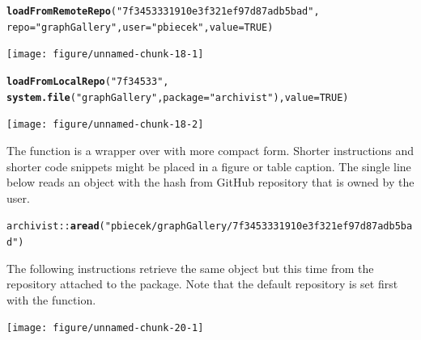 \documentclass[nojss]{jss}\usepackage[]{graphicx}\usepackage[]{color}
\makeatletter
\newcommand{\hlnum}[1]{\textcolor[rgb]{0.686,0.059,0.569}{#1}}%
\newcommand{\hlstr}[1]{\textcolor[rgb]{0.192,0.494,0.8}{#1}}%
\newcommand{\hlopt}[1]{\textcolor[rgb]{0,0,0}{#1}}%
\newcommand{\hlstd}[1]{\textcolor[rgb]{0.345,0.345,0.345}{#1}}%
\newcommand{\hlkwc}[1]{\textcolor[rgb]{0.333,0.667,0.333}{#1}}%
\newcommand{\hlkwd}[1]{\textcolor[rgb]{0.737,0.353,0.396}{\textbf{#1}}}%
\newenvironment{kframe}{%
 \def\at@end@of@kframe{}%
 \ifinner\ifhmode%
  \def\at@end@of@kframe{\end{minipage}}%
  \begin{minipage}{\columnwidth}%
 \fi\fi%
 \def\FrameCommand##1{\hskip\@totalleftmargin \hskip-\fboxsep
 \colorbox{shadecolor}{##1}\hskip-\fboxsep
     \hskip-\linewidth \hskip-\@totalleftmargin \hskip\columnwidth}%
 \MakeFramed {\advance\hsize-\width
   \@totalleftmargin\z@ \linewidth\hsize
   \@setminipage}}%
 {\par\unskip\endMakeFramed%
 \at@end@of@kframe}
\newenvironment{knitrout}{}{} %
\makeatother
\begin{document}
\begin{knitrout}
\color{fgcolor}\begin{kframe}
\begin{alltt}
\hlkwd{loadFromRemoteRepo}\hlstd{(}\hlstr{"7f3453331910e3f321ef97d87adb5bad"}\hlstd{,}
    \hlkwc{repo} \hlstd{=} \hlstr{"graphGallery"}\hlstd{,} \hlkwc{user} \hlstd{=} \hlstr{"pbiecek"}\hlstd{,} \hlkwc{value} \hlstd{=} \hlnum{TRUE}\hlstd{)}
\end{alltt}
\end{kframe}
\texttt{[image: figure/unnamed-chunk-18-1]} 
\begin{kframe}\begin{alltt}
\hlkwd{loadFromLocalRepo}\hlstd{(}\hlstr{"7f34533"}\hlstd{,}
    \hlkwd{system.file}\hlstd{(}\hlstr{"graphGallery"}\hlstd{,} \hlkwc{package} \hlstd{=} \hlstr{"archivist"}\hlstd{),} \hlkwc{value} \hlstd{=} \hlnum{TRUE}\hlstd{)}
\end{alltt}
\end{kframe}
\texttt{[image: figure/unnamed-chunk-18-2]} 

\end{knitrout}



The  function is a wrapper over  with more compact form. Shorter instructions and shorter code snippets might be placed in a figure or table caption. The single line below reads an object with the  hash from  GitHub repository  that is owned by the  user.

\begin{knitrout}
\color{fgcolor}\begin{kframe}
\begin{alltt}
\hlstd{archivist}\hlopt{::}\hlkwd{aread}\hlstd{(}\hlstr{"pbiecek/graphGallery/7f3453331910e3f321ef97d87adb5bad"}\hlstd{)}
\end{alltt}
\end{kframe}
\end{knitrout}



The following instructions retrieve the same  object but this time from the  repository attached to the  package. Note that the default repository is set first with the  function.

\begin{knitrout}
\color{fgcolor}
\texttt{[image: figure/unnamed-chunk-20-1]} 

\end{knitrout}
\end{document}
